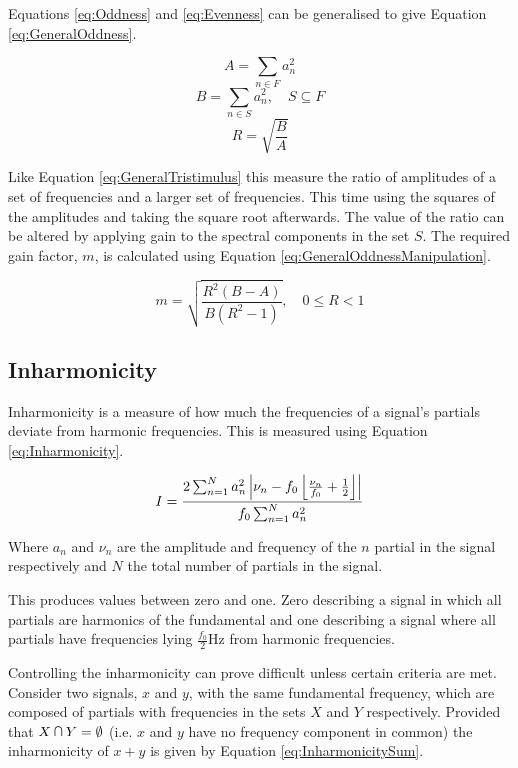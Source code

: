 		Equations \ref{eq:Oddness} and \ref{eq:Evenness} can be generalised to give Equation
		\ref{eq:GeneralOddness}.

		\[ A = \sum_{n \in F} a_{n}^{2} \]
		\[ B = \sum_{n \in S} a_{n}^{2}, \quad S \subseteq F \]
		\begin{equation}
			R = \sqrt{\frac{B}{A}}
			\label{eq:GeneralOddness}
		\end{equation}

		Like Equation \ref{eq:GeneralTristimulus} this measure the ratio of amplitudes of a set of frequencies and
		a larger set of frequencies. This time using the squares of the amplitudes and taking the square root
		afterwards. The value of the ratio can be altered by applying gain to the spectral components in the set
		$S$. The required gain factor, $m$, is calculated using Equation \ref{eq:GeneralOddnessManipulation}.

		\begin{equation}
			m = \sqrt{\frac{R^{2}(B - A)}{B(R^{2} - 1)}}, \quad 0 \leq R < 1
			\label{eq:GeneralOddnessManipulation}
		\end{equation}

	\subsection{Inharmonicity}
	\label{sec:FeatureControl-Parameterisation-Inharmonicity}
		Inharmonicity is a measure of how much the frequencies of a signal's partials deviate from harmonic
		frequencies. This is measured using Equation \ref{eq:Inharmonicity}.
		
		\begin{equation}
			I = \frac{2\sum_{n = 1}^{N}a_{n}^{2}
			           \left|\nu_{n} - f_{0}\left\lfloor\frac{\nu_{n}}{f_{0}} + \frac{1}{2}\right\rfloor\right|}
				   {f_{0}\sum_{n = 1}^{N} a_{n}^{2}}
			\label{eq:Inharmonicity}
		\end{equation}

		Where $a_{n}$ and $\nu_{n}$ are the amplitude and frequency of the $n$ partial in the signal
		respectively and $N$ the total number of partials in the signal.

		This produces values between zero and one. Zero describing a signal in which all partials are harmonics of
		the fundamental and one describing a signal where all partials have frequencies lying
		$\frac{f_{0}}{2}$Hz from harmonic frequencies.

		Controlling the inharmonicity can prove difficult unless certain criteria are met. Consider two signals,
		$x$ and $y$, with the same fundamental frequency, which are composed of partials with frequencies in the
		sets $X$ and $Y$ respectively. Provided that $X \medcap Y = \emptyset$ (i.e. $x$ and $y$ have no frequency
		component in common) the inharmonicity of $x + y$ is given by Equation \ref{eq:InharmonicitySum}.

